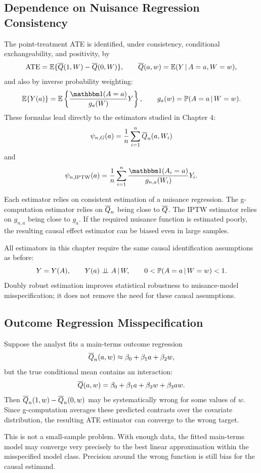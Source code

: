 \label{lec:7-1}

\subsection{Dependence on Nuisance Regression Consistency}

The point-treatment ATE is identified, under consistency, conditional exchangeability,
and positivity, by
\[
\operatorname{ATE}=\mathbb{E}\{\overline{Q}(1,W)-\overline{Q}(0,W)\},
\qquad
\overline{Q}(a,w)=\mathbb{E}(Y\,\vert\, A=a,W=w),
\]
and also by inverse probability weighting:
\[
\E\{\Ya{a}\}
=
\E\left\{\frac{\ind(A=a)}{g_a(W)}Y\right\},
\qquad
g_a(w)=\Prob(A=a\given W=w).
\]
These formulas lead directly to the estimators studied in Chapter 4:
\[
\psi_{n,G}(a)=\frac{1}{n}\sum_{i=1}^n\overline{Q}_n(a,W_i)
\]
and
\[
\psi_{n,\IPTW}(a)=
\frac{1}{n}\sum_{i=1}^n
\frac{\ind(A_i=a)}{g_{n,a}(W_i)}Y_i.
\]

Each estimator relies on consistent estimation of a nuisance regression. The
g-computation estimator relies on $\overline{Q}_n$ being close to $\overline{Q}$. The IPTW
estimator relies on $g_{n,a}$ being close to $g_a$. If the required nuisance function is
estimated poorly, the resulting causal effect estimator can be biased even in large
samples.

\begin{assumptionbox}
All estimators in this chapter require the same causal identification assumptions as
before:
\[
Y=Y(A),\qquad Y(a)\perp\!\!\!\perp A\,\vert\, W,\qquad 0<\mathbb{P}(A=a\,\vert\, W=w)<1.
\]
Doubly robust estimation improves statistical robustness to nuisance-model
misspecification; it does not remove the need for these causal assumptions.
\end{assumptionbox}

\subsection{Outcome Regression Misspecification}

Suppose the analyst fits a main-terms outcome regression
\[
\overline{Q}_n(a,w)\approx \beta_0+\beta_1a+\beta_2w,
\]
but the true conditional mean contains an interaction:
\[
\overline{Q}(a,w)=\beta_0+\beta_1a+\beta_2w+\beta_3aw.
\]
Then $\overline{Q}_n(1,w)-\overline{Q}_n(0,w)$ may be systematically wrong for some values of
$w$. Since g-computation averages these predicted contrasts over the covariate
distribution, the resulting ATE estimator can converge to the wrong target.

This is not a small-sample problem. With enough data, the fitted main-terms model may
converge very precisely to the best linear approximation within the misspecified
model class. Precision around the wrong function is still bias for the causal
estimand.

